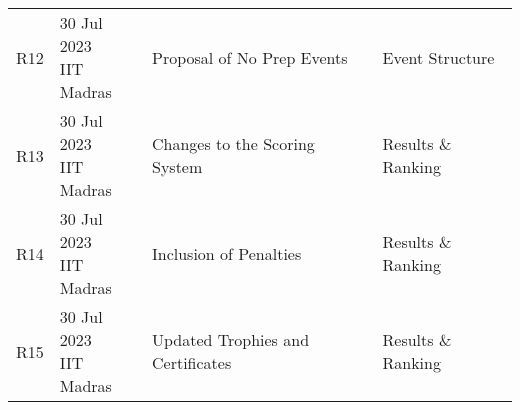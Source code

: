 \begin{center}
\begin{longtable}{c m{3.2cm} m{6.2cm} m{3.5cm}}
R12 & \makecell[l]{30 Jul 2023\\ IIT Madras} & Proposal of No Prep Events & Event Structure \\
R13 & \makecell[l]{30 Jul 2023\\ IIT Madras} & Changes to the Scoring System & Results \& Ranking \\
R14 & \makecell[l]{30 Jul 2023\\ IIT Madras} & Inclusion of Penalties & Results \& Ranking \\
R15 & \makecell[l]{30 Jul 2023\\ IIT Madras} & Updated Trophies and Certificates & Results \& Ranking \\
\hline
\end{longtable}
\end{center}